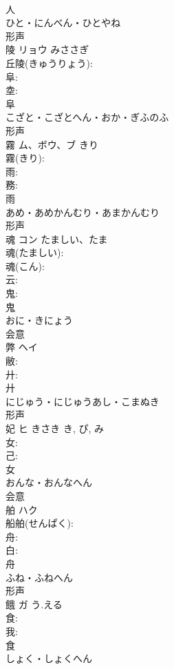 \documentclass[8pt]{extreport}
\begin{document}
\begin{CJK}{UTF8}{min}
\\	人	
\\	ひと・にんべん・ひとやね	
\\	形声 
\\	陵	リョウ	みささぎ		
\\	丘陵(きゅうりょう): 
\\	阜: 
\\	坴: 
\\	阜	
\\	こざと・こざとへん・おか・ぎふのふ	
\\	形声 
\\	霧	ム、ボウ、ブ	きり		
\\	霧(きり): 
\\	雨: 
\\	務: 
\\	雨	
\\	あめ・あめかんむり・あまかんむり	
\\	形声 
\\	魂	コン	たましい、たま		
\\	魂(たましい): 
\\	魂(こん): 
\\	云: 
\\	鬼: 
\\	鬼	
\\	おに・きにょう	
\\	会意 
\\	弊	ヘイ			
\\	敝: 
\\	廾: 
\\	廾	
\\	にじゅう・にじゅうあし・こまぬき	
\\	形声 
\\	妃	ヒ	きさき	き, ぴ, み	
\\	女: 
\\	己: 
\\	女	
\\	おんな・おんなへん	
\\	会意 
\\	舶	ハク			
\\	船舶(せんぱく): 
\\	舟: 
\\	白: 
\\	舟	
\\	ふね・ふねへん	
\\	形声 
\\	餓	ガ	う.える		
\\	食: 
\\	我: 
\\	食	
\\	しょく・しょくへん	

\end{CJK}
\end{document}
